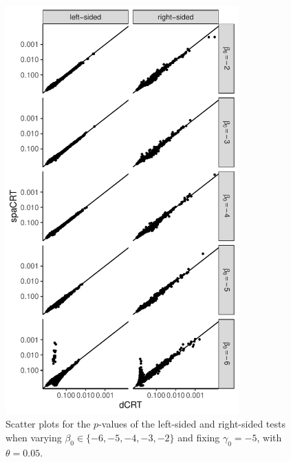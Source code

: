 \documentclass[12pt]{article}
\theoremstyle{definition}
\begin{document}
\begin{figure}
  \centering
  \includegraphics[width=0.8\textwidth]{figures-and-tables/simulation/QQ/plot-bin-NB-normal-B-50000-n-5000-5e3-n5-n5-disp-5e-2full-dCRT-spaCRT-varying-beta.pdf}
  \caption{Scatter plots for the $p$-values of the left-sided and right-sided tests when varying $\beta_0\in \{-6,-5,-4,-3,-2\}$ and fixing $\gamma_0=-5$, with $\theta = 0.05$.}
  \label{fig:simulation-dot-plot-varying-beta-theta-0.05}
\end{figure}
\end{document}
